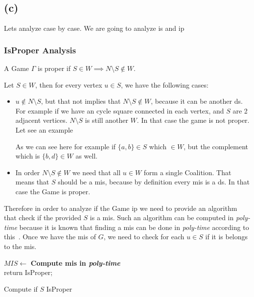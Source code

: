 \documentclass[12pt, a4paper]{article}
\begin{document}
\subsection{(c)}
Lets analyze case by case. We are going to analyze \acrshort{is} and \acrshort{ip}

\subsubsection{IsProper Analysis}
A Game $\Gamma$ is proper if $S \in W \implies N \setminus S \notin W$.

Let $S \in W$, then for every vertex $u \in S$, we have the following cases:
\begin{itemize}
  \item $u \notin N \setminus S$, but that not implies that $N \setminus S \notin W$, because it can be another \acrlong{ds}.
  For example if we have an cycle square connected in each vertex, and $S$ are 2 adjacent vertices. $N \setminus S$ is still another $W$. 
  In that case the game is not proper. Let see an example


  As we can see here for example if $\{a,b\} \in S$ which $\in W$, but the complement which is $\{b,d\} \in W$ as well.

  \item In order $N \setminus S \notin W$ we need that all $u \in W$ form a single Coalition. That means that $S$ should be a \acrfull{mis},
  because by definition every \acrlong{mis} is a \acrlong{ds}. In that case the Game is proper.
\end{itemize}

Therefore in order to analyze if the Game \acrlong{ip} we need to provide an algorithm that check if the provided $S$ is a \acrlong{mis}.
Such an algorithm can be computed in \textit{poly-time} because it is known that finding a \acrlong{mis} can be done in \textit{poly-time} according to this~\cite{mis_complex}.
Once we have the \acrlong{mis} of $G$, we need to check for each $u \in S$ if it is belongs to the \acrlong{mis}.

\begin{algorithm}[H]
  $MIS \leftarrow$ \textbf{Compute \acrlong{mis} in \textit{poly-time}}\\
  return IsProper;
  \caption{Compute if $S$ IsProper}
\end{algorithm}
\end{document}
